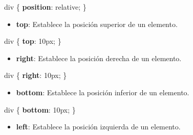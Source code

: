 \documentclass[
  a4paper,
  DIV=11,
  numbers=noendperiod,
  onepage,
  openany]{scrreprt}
\newenvironment{Shaded}{\begin{snugshade}}{\end{snugshade}}
\newcommand{\CharTok}[1]{\textcolor[rgb]{0.13,0.47,0.30}{#1}}
\newcommand{\DataTypeTok}[1]{\textcolor[rgb]{0.68,0.00,0.00}{#1}}
\newcommand{\DecValTok}[1]{\textcolor[rgb]{0.68,0.00,0.00}{#1}}
\newcommand{\KeywordTok}[1]{\textcolor[rgb]{0.00,0.23,0.31}{\textbf{#1}}}
\newcommand{\NormalTok}[1]{\textcolor[rgb]{0.00,0.23,0.31}{#1}}
\newcommand{\OperatorTok}[1]{\textcolor[rgb]{0.37,0.37,0.37}{#1}}
\providecommand{\tightlist}{%
  \setlength{\itemsep}{0pt}\setlength{\parskip}{0pt}}\usepackage{longtable,booktabs,array}
\begin{document}
\begin{tcolorbox}
\begin{Shaded}
\begin{Highlighting}[]
\NormalTok{div \{}
  \KeywordTok{position}\CharTok{:} \DecValTok{relative}\OperatorTok{;}
\NormalTok{\}}
\end{Highlighting}
\end{Shaded}

\begin{itemize}
\tightlist
\item
  \textbf{top}: Establece la posición superior de un elemento.
\end{itemize}

\begin{Shaded}
\begin{Highlighting}[]
\NormalTok{div \{}
  \KeywordTok{top}\CharTok{:} \DecValTok{10}\DataTypeTok{px}\OperatorTok{;}
\NormalTok{\}}
\end{Highlighting}
\end{Shaded}

\begin{itemize}
\tightlist
\item
  \textbf{right}: Establece la posición derecha de un elemento.
\end{itemize}

\begin{Shaded}
\begin{Highlighting}[]
\NormalTok{div \{}
  \KeywordTok{right}\CharTok{:} \DecValTok{10}\DataTypeTok{px}\OperatorTok{;}
\NormalTok{\}}
\end{Highlighting}
\end{Shaded}

\begin{itemize}
\tightlist
\item
  \textbf{bottom}: Establece la posición inferior de un elemento.
\end{itemize}

\begin{Shaded}
\begin{Highlighting}[]
\NormalTok{div \{}
  \KeywordTok{bottom}\CharTok{:} \DecValTok{10}\DataTypeTok{px}\OperatorTok{;}
\NormalTok{\}}
\end{Highlighting}
\end{Shaded}

\begin{itemize}
\tightlist
\item
  \textbf{left}: Establece la posición izquierda de un elemento.
\end{itemize}


\end{tcolorbox}
\end{document}
